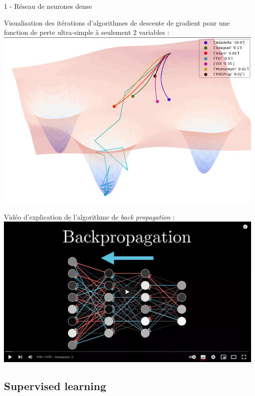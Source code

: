 \documentclass[10pt,serif,mathserif,compress,hyperref={colorlinks}]{beamer}
\begin{document}
\begin{frame}{1 - Réseau de neurones dense}

  {\small Visualisation des itérations d'algorithmes de descente de gradient pour une fonction de perte ultra-simple à seulement 2 variables :}\\[2mm]
  \hspace*{25mm}\href{https://github.com/Jaewan-Yun/optimizer-visualization/blob/master/figures/movie9.gif}{\includegraphics[width=.45\textwidth]{images/adam_plot3D_animated.png}}\\[-2mm]

  \medskip
  {\small Vidéo d'explication de l'algorithme de {\em back propagation} :}\\
  \hspace*{30mm}\href{https://www.3blue1brown.com/lessons/backpropagation}{\includegraphics[width=.35\textwidth]{images/video-BackPropagation.png}}
\end{frame}

\subsection{Supervised learning}
\end{document}
